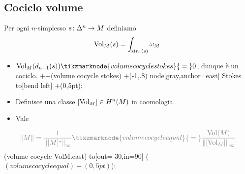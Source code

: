 \documentclass{beamer}
\begin{document}
\subsection*{Cociclo volume}
\begin{frame}{\secname}{\subsecname}
Per ogni $n$-simplesso $\map{s}{\Delta^n}{M}$ definiamo
\[
\operatorname{Vol}_M(s)=\int_{\operatorname{str}_n(s)}\omega_M.
\]
\begin{itemize}
\item $\Vol_M(d_{n+1}(s))\tikzmarknode{volume cocycle stokes}{{}={}}0$, dunque è un cociclo.
 ++(volume cocycle stokes) +(-1,.8) node[gray,anchor=east] {Stokes} to[bend left] +(0,5pt);
\item Definisce una classe $[\operatorname{Vol}_M]\in H^n(M)$ in coomologia.
\item Vale 
\end{itemize}
\vspace{.5cm}
\[
\color{gray} \norm{M}=\frac{1}{\norm{[M]^*}_\infty}\tikzmarknode{volume cocycle equal}{{}={}}\frac{\Vol(M)}{\norm{[\Vol_M]}_\infty}
\]
 (volume cocycle VolM.east) to[out=-30,in=90] ($(volume cocycle equal)+(0,5pt)$);
\end{frame}
\end{document}
